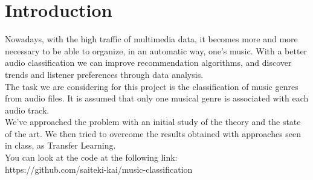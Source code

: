\section{Introduction}
Nowadays, with the high traffic of multimedia data, it becomes more and more 
necessary to be able to organize, in an automatic way, one's music. 
With a better audio classification we can improve recommendation algorithms, and discover trends and listener preferences through data analysis. \\

The task we are considering for this project is the classification of music 
genres from audio files.
It is assumed that only one musical genre is associated with each audio track. \\

We've approached the problem with an initial study of the theory and the state of the art. 
We then tried to overcome the results obtained with approaches seen in class, as Transfer Learning. \\

You can look at the code at the following link: \\
{https://github.com/saiteki-kai/music-classification}
